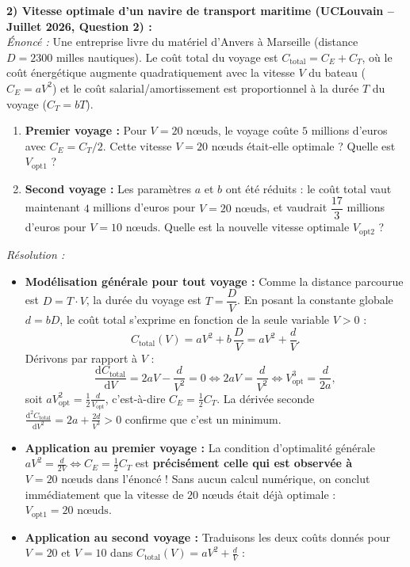 \begin{exemple}
\medskip
\textbf{2) Vitesse optimale d'un navire de transport maritime (UCLouvain -- Juillet 2026, Question 2) :}\\
\emph{Énoncé :} Une entreprise livre du matériel d'Anvers à Marseille (distance $D = 2300$ milles nautiques). Le coût total du voyage est $C_{\text{total}} = C_E + C_T$, où le coût énergétique augmente quadratiquement avec la vitesse $V$ du bateau ($C_E = aV^2$) et le coût salarial/amortissement est proportionnel à la durée $T$ du voyage ($C_T = bT$).
\begin{enumerate}[label=(\arabic*)]
    \item \textbf{Premier voyage :} Pour $V = 20\text{ nœuds}$, le voyage coûte $5$ millions d'euros avec $C_E = C_T / 2$. Cette vitesse $V = 20\text{ nœuds}$ était-elle optimale ? Quelle est $V_{\text{opt1}}$ ?
    \item \textbf{Second voyage :} Les paramètres $a$ et $b$ ont été réduits : le coût total vaut maintenant $4$ millions d'euros pour $V = 20\text{ nœuds}$, et vaudrait $\dfrac{17}{3}$ millions d'euros pour $V = 10\text{ nœuds}$. Quelle est la nouvelle vitesse optimale $V_{\text{opt2}}$ ?
\end{enumerate}
\emph{Résolution :}
\begin{itemize}
    \item \textbf{Modélisation générale pour tout voyage :} Comme la distance parcourue est $D = T \cdot V$, la durée du voyage est $T = \dfrac{D}{V}$. En posant la constante globale $d = bD$, le coût total s'exprime en fonction de la seule variable $V > 0$ :
    \[
        C_{\text{total}}(V) = aV^2 + b\,\frac{D}{V} = aV^2 + \frac{d}{V}.
    \]
    Dérivons par rapport à $V$ :
    \[
        \frac{\mathrm{d}C_{\text{total}}}{\mathrm{d}V} = 2aV - \frac{d}{V^2} = 0 \iff 2aV = \frac{d}{V^2} \iff \boxed{V_{\text{opt}}^3 = \frac{d}{2a}},
    \]
    soit $aV_{\text{opt}}^2 = \frac{1}{2}\frac{d}{V_{\text{opt}}}$, c'est-à-dire $C_E = \frac{1}{2}C_T$.
    La dérivée seconde $\frac{\mathrm{d}^2 C_{\text{total}}}{\mathrm{d}V^2} = 2a + \frac{2d}{V^3} > 0$ confirme que c'est un minimum.
    \item \textbf{Application au premier voyage :} La condition d'optimalité générale $aV^2 = \frac{d}{2V} \iff C_E = \frac{1}{2}C_T$ est \textbf{précisément celle qui est observée à $V = 20\text{ nœuds}$} dans l'énoncé ! Sans aucun calcul numérique, on conclut immédiatement que la vitesse de $20\text{ nœuds}$ était déjà optimale : $\boxed{V_{\text{opt1}} = 20\text{ nœuds}}$.
    \item \textbf{Application au second voyage :} Traduisons les deux coûts donnés pour $V = 20$ et $V = 10$ dans $C_{\text{total}}(V) = aV^2 + \frac{d}{V}$ :

\end{itemize}
\end{exemple}
